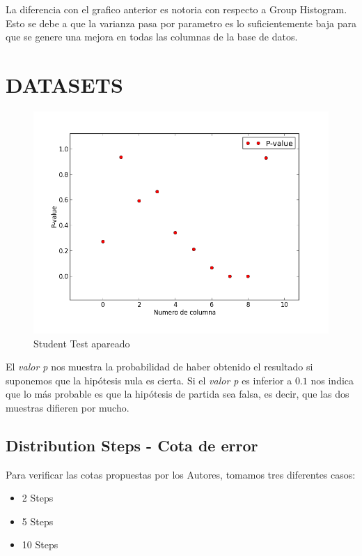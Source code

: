 \documentclass[10pt, a4paper,english,spanish,hidelinks]{article}
\begin{document}
La diferencia con el grafico anterior es notoria con respecto a Group Histogram. Esto se debe a que la varianza pasa por parametro es lo suficientemente baja para que se genere una mejora en todas las columnas de la base de datos. 



\newpage

\section{DATASETS}

\begin{figure}
  \centering
  \includegraphics[scale=0.6]{./imagenes/ejc1_p_100.png}
  \caption{Student Test apareado}
\end{figure}


El \textit{valor p} nos muestra la probabilidad de haber obtenido el resultado si suponemos que la hipótesis nula es cierta. Si el \textit{valor p} es inferior a $0.1$ nos indica que lo más probable es que la hipótesis de partida sea falsa, es decir, que las dos muestras difieren por mucho.

\newpage

\subsection{Distribution Steps - Cota de error}

Para verificar las cotas propuestas por los Autores, tomamos tres diferentes casos:

\begin{itemize}
\item 2  Steps
\item 5  Steps
\item 10 Steps
\end{itemize}
\end{document}
